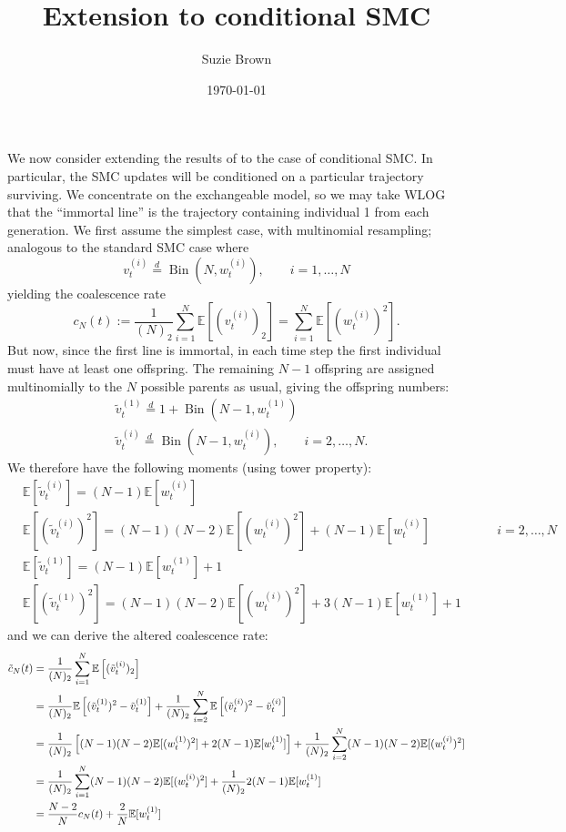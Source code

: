 \documentclass{article}
\title{Extension to conditional SMC}
\author{Suzie Brown}
\date{\today}
\newcommand{\E}{\mathbb{E}}
\newcommand{\vt}[2][t]{v_{#1}^{(#2)}}
\newcommand{\vttilde}[2][t]{\tilde{v}_{#1}^{(#2)}}
\newcommand{\wt}[2][t]{w_{#1}^{(#2)}}
\newcommand{\eqdist}{\overset{d}{=}}
\newcommand{\Bin}{\operatorname{Bin}}
\begin{document}
\maketitle
We now consider extending the results of \citet{koskela2018} to the case of conditional SMC.
In particular, the SMC updates will be conditioned on a particular trajectory surviving. We concentrate on the exchangeable model, so we may take WLOG that the ``immortal line'' is the trajectory containing individual 1 from each generation.
We first assume the simplest case, with multinomial resampling; analogous to the standard SMC case where
\begin{equation*}
\vt{i} \eqdist \Bin (N, \wt{i}), \qquad i=1,\dots,N
\end{equation*}
yielding the coalescence rate
\begin{equation}
c_N(t) := \frac{1}{(N)_2} \sum_{i=1}^{N} \E\left[ (\vt{i})_2 \right] = \sum_{i=1}^{N} \E\left[(\wt{i})^2\right].
\end{equation}
But now, since the first line is immortal, in each time step the first individual must have at least one offspring. The remaining $N-1$ offspring are assigned multinomially to the $N$ possible parents as usual, giving the offspring numbers:
\begin{align*}
& \vttilde{1} \eqdist 1 + \Bin(N-1, \wt{1}) \\
& \vttilde{i} \eqdist \Bin(N-1, \wt{i}), \qquad i=2,\dots,N.
\end{align*}
We therefore have the following moments (using tower property):
\begin{align*}
& \E[\vttilde{i}] = (N-1)\E[\wt{i}] &\\
& \E[(\vttilde{i})^2] = (N-1)(N-2)\E[(\wt{i})^2] + (N-1)\E[\wt{i}] &\qquad i=2,\dots,N \\
& \E[\vttilde{1}] = (N-1)\E[\wt{1}] + 1 \\
& \E[(\vttilde{1})^2] = (N-1)(N-2)\E[(\wt{i})^2] + 3(N-1)\E[\wt{1}] + 1 &
\end{align*}
and we can derive the altered coalescence rate:
\begin{align}
\tilde{c}_N(t) &= \frac{1}{(N)_2} \sum_{i=1}^{N} \E\left[ (\vttilde{i})_2 \right] \notag\\
&= \frac{1}{(N)_2} \E\left[ (\vttilde{1})^2 - \vttilde{1} \right] + \frac{1}{(N)_2}\sum_{i=2}^{N} \E\left[ (\vttilde{i})^2 - \vttilde{i} \right] \notag\\
&= \frac{1}{(N)_2}\left[ (N-1)(N-2)\E[(\wt{1})^2] + 2(N-1)\E[\wt{1}] \right] + \frac{1}{(N)_2} \sum_{i=2}^{N} (N-1)(N-2)\E[(\wt{i})^2] \notag\\
&= \frac{1}{(N)_2} \sum_{i=1}^{N} (N-1)(N-2)\E[(\wt{i})^2] + \frac{1}{(N)_2} 2(N-1)\E[\wt{1}] \notag\\
&= \frac{N-2}{N} c_N(t) + \frac{2}{N} \E[\wt{1}]
\end{align}
\end{document}
